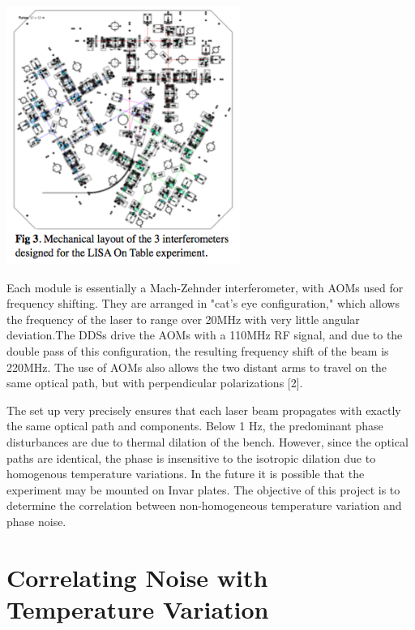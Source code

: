 \documentclass[11 pt]{article}
\begin{document}
\begin{center}\includegraphics[width=3in]{mechaniclayout.png}\end{center}

Each module is essentially a Mach-Zehnder interferometer, with AOMs used for frequency shifting. They are arranged in "cat's eye configuration," which allows  the frequency of the laser to range over 20MHz with very little angular deviation.The DDSs drive the AOMs with a 110MHz RF signal, and due to the double pass of this configuration, the resulting frequency shift of the beam is 220MHz. The use of AOMs also allows the two distant arms to travel on the same optical path, but with perpendicular polarizations [2].

The set up very precisely ensures that each laser beam propagates with exactly the same optical path and components. Below 1 Hz, the predominant phase disturbances are due to thermal dilation of the bench. However, since the optical paths are identical, the phase is insensitive to the isotropic dilation due to homogenous temperature variations. In the future it is possible that the experiment may be mounted on Invar plates. The objective of this project is to determine the correlation between non-homogeneous temperature variation and phase noise.


\section{Correlating Noise with Temperature Variation}
\end{document}
